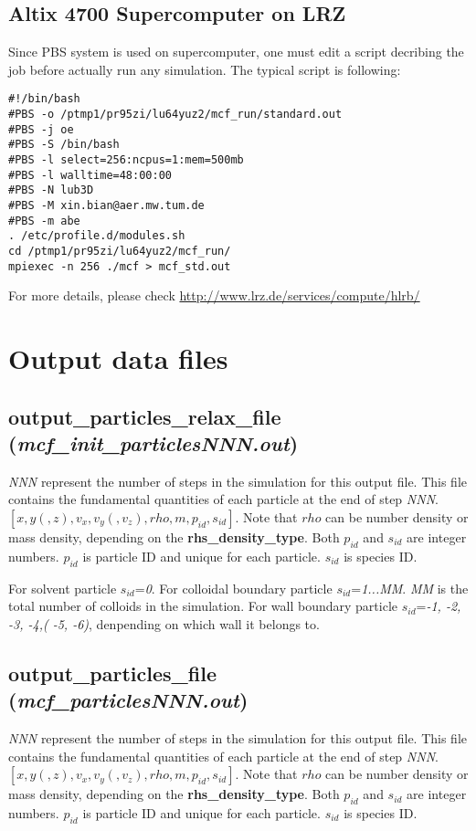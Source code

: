 \documentclass[a4paper,10pt]{article}
\begin{document}
\subsection{Altix 4700 Supercomputer on LRZ}
Since PBS system is used on supercomputer,
one must edit a script decribing the job
before actually run any simulation.
The typical script is following:
\begin{verbatim}
#!/bin/bash 
#PBS -o /ptmp1/pr95zi/lu64yuz2/mcf_run/standard.out
#PBS -j oe 
#PBS -S /bin/bash 
#PBS -l select=256:ncpus=1:mem=500mb
#PBS -l walltime=48:00:00 
#PBS -N lub3D
#PBS -M xin.bian@aer.mw.tum.de 
#PBS -m abe 
. /etc/profile.d/modules.sh 
cd /ptmp1/pr95zi/lu64yuz2/mcf_run/
mpiexec -n 256 ./mcf > mcf_std.out
\end{verbatim}
For more details,
please
check
\url{http://www.lrz.de/services/compute/hlrb/}
\section{Output data files}

\subsection{\textbf{output\_particles\_relax\_file}\\
(\textit{mcf\_init\_particlesNNN.out})}
\textit{NNN} represent the number of steps in the simulation for this output file.
This file contains the fundamental quantities of each particle
at the end of step \textit{NNN}.
\textbf{$[x, y(, z), v_x, v_y(, v_z), rho, m, p_{id}, s_{id}]$}.
Note that \textbf{$rho$} can be number density or mass density,
depending on the \textbf{rhs\_density\_type}.
Both \textbf{$p_{id}$} and \textbf{$s_{id}$} are integer numbers.
\textbf{$p_{id}$} is particle ID and
unique for each particle.
\textbf{$s_{id}$} is species ID.

For solvent particle \textbf{$s_{id}$}=\textit{0}.
For colloidal boundary particle \textbf{$s_{id}$}=\textit{1...\textit{MM}}.
\textit{MM} is the total number of colloids
in the simulation.
For wall boundary particle \textbf{$s_{id}$}=\textit{-1, -2, -3, -4,( -5, -6)},
denpending on which wall it belongs to.

\subsection{\textbf{output\_particles\_file}\\
(\textit{mcf\_particlesNNN.out})}
\textit{NNN} represent the number of steps in the simulation for this output file.
This file contains the fundamental quantities of each particle
at the end of step \textit{NNN}.
\textbf{$[x, y(, z), v_x, v_y(, v_z), rho, m, p_{id}, s_{id}]$}.
Note that \textbf{$rho$} can be number density or mass density,
depending on the \textbf{rhs\_density\_type}.
Both \textbf{$p_{id}$} and \textbf{$s_{id}$} are integer numbers.
\textbf{$p_{id}$} is particle ID and
unique for each particle.
\textbf{$s_{id}$} is species ID.
\end{document}
